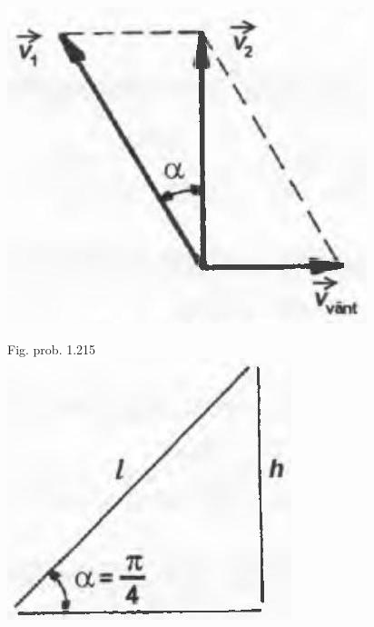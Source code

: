 \documentclass[10pt]{article}
\begin{document}
\begin{center}
\includegraphics[max width=\textwidth]{2025_07_01_5b3ff9fa0d508c8e9f17g-245}
\end{center}

Fig. prob. 1.215\\
\includegraphics[max width=\textwidth, center]{2025_07_01_5b3ff9fa0d508c8e9f17g-245(1)}
\end{document}
